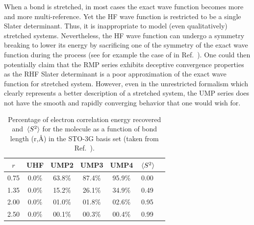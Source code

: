 \documentclass[11pt,a4paper]{article}
\begin{document}
When a bond is stretched, in most cases the exact wave function becomes more and more multi-reference. Yet the HF wave function is restricted to be a single Slater determinant.
Thus, it is inappropriate to model (even qualitatively) stretched systems. Nevertheless, the HF wave function can undergo a symmetry breaking to lower its energy by sacrificing one of the symmetry of the exact wave function during the process (see for example the case of  in Ref.~\cite{SzaboBook}). 
One could then potentially claim that the RMP series exhibits deceptive convergence properties as the RHF Slater determinant is a poor approximation of the exact wave function for stretched system. However, even in the unrestricted formalism which clearly represents a better description of a stretched system, the UMP series does not have the smooth and rapidly converging behavior that one would wish for. 

\begin{table}
    \centering
    \caption{Percentage of electron correlation energy recovered and $\expval*{S^2}$ for the  molecule as a function of bond length (r,\si{\angstrom}) in the STO-3G basis set (taken from Ref.~\cite{Gill_1988}).}
    \begin{tabular}{ccccccc}
\hline
\hline
 $r$ & UHF & UMP2 & UMP3 & UMP4 & $\expval*{S^2}$ \\
\hline
0.75 & 0.0\% & 63.8\% & 87.4\% & 95.9\% & 0.00\\
1.35 & 0.0\% & 15.2\% & 26.1\% & 34.9\% & 0.49\\
2.00 & 0.0\% & 01.0\% & 01.8\% & 02.6\% & 0.95\\
2.50 & 0.0\% & 00.1\% & 00.3\% & 00.4\% & 0.99\\
\hline
\hline
\end{tabular}
    \label{tab:SpinContamination}
\end{table}
\end{document}
